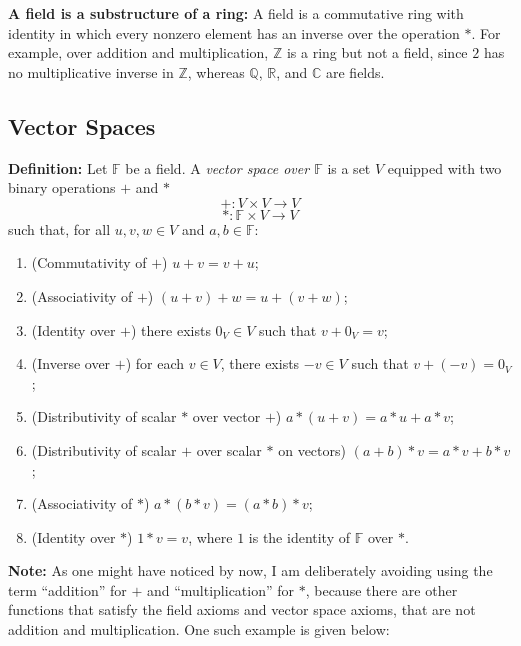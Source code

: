 \documentclass[a4paper,11pt,abstract=true]{scrartcl}
\theoremstyle{dotlessP}
\theoremstyle{dotlessS}
\theoremstyle{remark}
\theoremstyle{definition}
\begin{document}
\begin{remark_box}
\textbf{A field is a substructure of a ring:} A field is a commutative
ring with identity in which every nonzero element has an inverse over the operation $*$.
For example, over addition and multiplication, $\mathbb{Z}$ is a ring but not a field, since $2$ has no
multiplicative inverse in $\mathbb{Z}$, whereas $\mathbb{Q}$, $\mathbb{R}$,
and $\mathbb{C}$ are fields.
\end{remark_box}

\subsection{Vector Spaces}

\textbf{Definition:} Let $\mathbb{F}$ be a field. A \emph{vector space over $\mathbb{F}$} is a
set $V$ equipped with two binary operations $+$ and $*$
\[
+:V\times V\longrightarrow V
\]
\[
*:\mathbb{F}\times V\longrightarrow V
\]
such that, for all $u,v,w\in V$ and $a,b\in \mathbb{F}$:
\begin{enumerate}
    \item (Commutativity of $+$) $u+v=v+u$;
    \item (Associativity of $+$) $(u+v)+w=u+(v+w)$;
    \item (Identity over $+$) there exists $0_V\in V$ such that $v+0_V=v$;
    \item (Inverse over $+$) for each $v\in V$, there exists $-v\in V$ such that $v+(-v)=0_V$;
    \item (Distributivity of scalar $*$ over vector $+$) $a*(u+v)=a*u+a*v$;
    \item (Distributivity of scalar $+$ over scalar $*$ on vectors) $(a+b)*v=a*v+b*v$;
    \item (Associativity of $*$) $a*(b*v)=(a*b)*v$;
    \item (Identity over $*$) $1*v=v$, where $1$ is the identity of $\mathbb{F}$ over $*$.
\end{enumerate}

\textbf{Note:} As one might have noticed by now, I am deliberately avoiding using the term ``addition'' for $+$ and ``multiplication'' for $*$, because there are other functions that satisfy the field axioms and vector space axioms, that are not addition and multiplication. One such example is given below:
\end{document}
